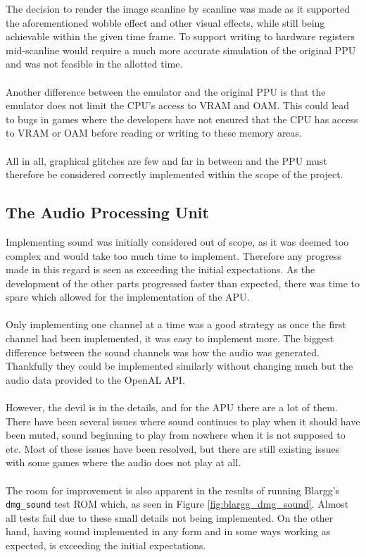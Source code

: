 The decision to render the image scanline by scanline was made as it supported the aforementioned wobble effect and other visual effects, while still being achievable within the given time frame. To support writing to hardware registers mid-scanline would require a much more accurate simulation of the original PPU and was not feasible in the allotted time.\\
\\
Another difference between the emulator and the original PPU is that the emulator does not limit the CPU's access to VRAM and OAM. This could lead to bugs in games where the developers have not ensured that the CPU has access to VRAM or OAM before reading or writing to these memory areas.\\
\\
All in all, graphical glitches are few and far in between and the PPU must therefore be considered correctly implemented within the scope of the project.

\subsection{The Audio Processing Unit}
Implementing sound was initially considered out of scope, as it was deemed too complex and would take too much time to implement. Therefore any progress made in this regard is seen as exceeding the initial expectations. As the development of the other parts progressed faster than expected, there was time to spare which allowed for the implementation of the APU.
\\\\
Only implementing one channel at a time was a good strategy as once the first channel had been implemented, it was easy to implement more. The biggest difference between  the sound channels was how the audio was generated. Thankfully they could be implemented similarly without changing much but the audio data provided to the OpenAL API.
\\\\
However, the devil is in the details, and for the APU there are a lot of them. There have been several issues where sound continues to play when it should have been muted, sound beginning to play from nowhere when it is not supposed to etc. Most of these issues have been resolved, but there are still existing issues with some games where the audio does not play at all.
\\\\
The room for improvement is also apparent in the results of running Blargg's \texttt{dmg\_sound} \cite{Blargg} test ROM which, as seen in Figure \ref{fig:blargg_dmg_sound}. Almost all tests fail due to these small details not being implemented. On the other hand, having sound implemented in any form and in some ways working as expected, is exceeding the initial expectations.

